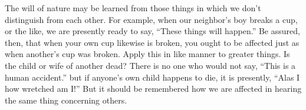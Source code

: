 The  will  of nature  may  be  learned from  those  things  in which  we  don't
distinguish from each other. For example, when our neighbor's boy breaks a cup,
or the like,  we are presently ready  to say, ``These things  will happen.'' Be
assured, then,  that when  your own  cup likewise  is broken,  you ought  to be
affected just as  when another's cup was  broken. Apply this in  like manner to
greater things. Is the child or wife of another dead? There is no one who would
not say,  ``This is a  human accident.'' but if  anyone's own child  happens to
die, it is presently, ``Alas I how wretched am I!'' But it should be remembered
how we are affected in hearing the same thing concerning others.
